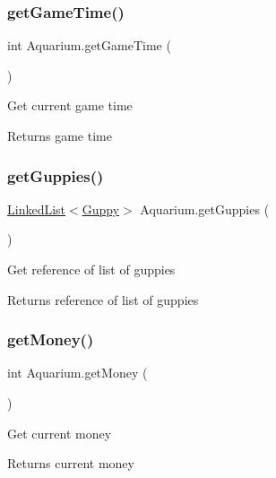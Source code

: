 \subsubsection{\texorpdfstring{get\+Game\+Time()}{getGameTime()}}
{\footnotesize\ttfamily int Aquarium.\+get\+Game\+Time (\begin{DoxyParamCaption}{ }\end{DoxyParamCaption})\hspace{0.3cm}{\ttfamily [inline]}}

Get current game time \begin{DoxyReturn}{Returns}
game time 
\end{DoxyReturn}
\mbox{\label{class_aquarium_a066f295616bf7dc88c0612c663c7ec2a}} 
\subsubsection{\texorpdfstring{get\+Guppies()}{getGuppies()}}
{\footnotesize\ttfamily \mbox{\hyperlink{class_linked_list}{Linked\+List}}$<$\mbox{\hyperlink{class_guppy}{Guppy}}$>$ Aquarium.\+get\+Guppies (\begin{DoxyParamCaption}{ }\end{DoxyParamCaption})\hspace{0.3cm}{\ttfamily [inline]}}

Get reference of list of guppies \begin{DoxyReturn}{Returns}
reference of list of guppies 
\end{DoxyReturn}
\mbox{\label{class_aquarium_ae7d57c7679df14fed4c89b7e5a132316}} 
\subsubsection{\texorpdfstring{get\+Money()}{getMoney()}}
{\footnotesize\ttfamily int Aquarium.\+get\+Money (\begin{DoxyParamCaption}{ }\end{DoxyParamCaption})\hspace{0.3cm}{\ttfamily [inline]}}

Get current money \begin{DoxyReturn}{Returns}
current money 
\end{DoxyReturn}
\mbox{\label{class_aquarium_ab45bfd1f7ccbbb8cbe497a0c30c026d3}} 
